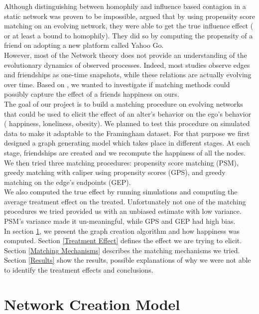 \documentclass[11pt]{article}
\begin{document}
Although distinguishing between homophily and influence based contagion in a static network was proven to be impossible, \cite{aral2009distinguishing} argued that by using propensity score matching on an evolving network, they were able to get the true influence effect ( or at least a bound to homophily). They did so by computing the propensity of a friend on adopting a new platform called Yahoo Go.\\

However, most of the Network theory does not provide an understanding of the evolutionary dynamics of observed processes. Indeed, most studies observe edges and friendships as one-time snapshots, while these relations are actually evolving over time. Based on \cite{aral2009distinguishing}, we wanted to investigate if matching methods could possibly capture the effect of a friends happiness on ours.\\

The goal of our project is to build a matching procedure on evolving networks that could be used to elicit the effect of an alter’s behavior on the ego’s behavior ( happiness, loneliness, obesity). We planned to test this procedure on simulated data to make it adaptable to the Framingham dataset. For that purpose we first designed a graph generating model which takes place in different stages. At each stage, friendships are created and we recompute the happiness of all the nodes. We then tried three matching procedures: propensity score matching (PSM), greedy matching with caliper using propensity scores (GPS), and greedy matching on the edge’s endpoints (GEP).\\

We also computed the true effect by running simulations and computing the average treatment effect on the treated. Unfortunately not one of the matching procedures we tried provided us with an unbiased estimate with low variance. PSM’s variance made it un-meaningful, while GPS and GEP had high bias.\\

In section \ref{Network Creation Model}, we present the graph creation algorithm and how happiness was computed. Section \ref{Treatment Effect} defines the effect we are trying to elicit. Section \ref{Matching Mechanisms} describes the matching mechanisms we tried. Section \ref{Results} show the results, possible explanations of why we were not able to identify the treatment effects and conclusions.\\

\section{Network Creation Model}
\label{Network Creation Model}
\end{document}
